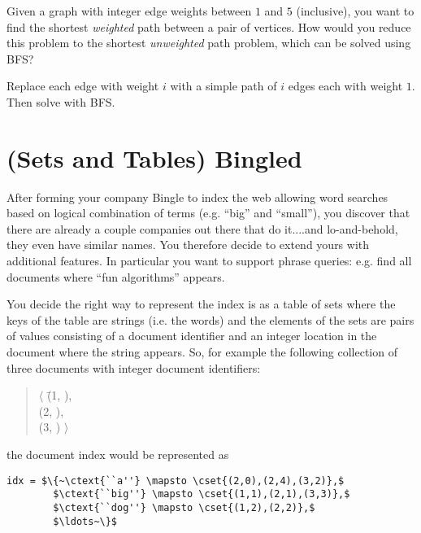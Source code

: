 
\begin{problem}

\answer

Given a graph with integer edge weights between $1$ and $5$
(inclusive), you want to find the shortest \emph{weighted} path
between a pair of vertices.  How would you reduce this problem to the
shortest \emph{unweighted} path problem, which can be solved using
BFS?

\sol
  Replace each edge with weight $i$ with a simple path of $i$ edges
  each with weight $1$. Then solve with BFS.
\end{problem}



\section{(Sets and Tables) Bingled}

After forming your company Bingle to index the web allowing word
searches based on logical combination of terms (e.g. ``big'' and
``small''), you discover that there are already a couple companies out
there that do it....and lo-and-behold, they even have similar names.
You therefore decide to extend yours with additional features.  In
particular you want to support phrase queries: e.g. find all
documents where ``fun algorithms'' appears.

You decide the right way to represent the index is as a table of sets
where the keys of the table are strings (i.e. the words) and the
elements of the sets are pairs of values consisting of a document
identifier and an integer location in the document where the string
appears.  So, for example the following collection of three documents
with integer document identifiers:

\begin{quote}
\begin{tabbing}
 $\langle$
  \=(1, ), \\
  \>(2, ),\\
  \>(3, ) $\rangle$
\end{tabbing}
\end{quote}

the document index would be represented as
\begin{lstlisting}[numbers=none]
idx = $\{~\ctext{``a''} \mapsto \cset{(2,0),(2,4),(3,2)},$
        $\ctext{``big''} \mapsto \cset{(1,1),(2,1),(3,3)},$
        $\ctext{``dog''} \mapsto \cset{(1,2),(2,2)},$
        $\ldots~\}$
\end{lstlisting}

